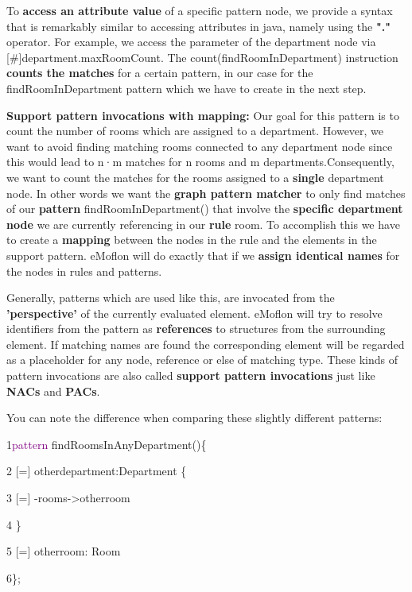 To \textbf{access an attribute value} of a specific pattern node, we provide a syntax that is remarkably similar to accessing attributes in java, namely using the \textbf{"."} operator.\newline
For example, we access the parameter of the department node via \textsf{[\#]department.maxRoomCount}. The \textsf{ count(findRoomInDepartment)} instruction \textbf{counts the matches} for a certain pattern, in our case for the \textsf{findRoomInDepartment} pattern which we have to create in the next step.\newline

\textbf{Support pattern invocations with mapping:}\newline
Our goal for this pattern is to count the number of rooms which are assigned to a department. However, we want to avoid finding matching rooms connected to any department node since this would lead to \textsf{n·m} matches for \textsf{n} rooms and \textsf{m} departments.\newline Consequently, we want to count the matches for the rooms assigned to a \textbf{single} department node. In other words we want the \textbf{graph pattern matcher} to only find matches of our \textbf{pattern} \textsf{findRoomInDepartment()} that involve the \textbf{specific department node} we are currently referencing in our \textbf{rule} \textsf{room}. To accomplish this we have to create a \textbf{mapping} between the nodes in the rule and the elements in the support pattern. eMoflon will do exactly that if we \textbf{assign identical names} for the nodes in rules and patterns.\newline

Generally, patterns which are used like this, are invocated from the \textbf{'perspective'} of the currently evaluated element. eMoflon will try to resolve identifiers from the pattern as \textbf{references} to structures from the surrounding element. If matching names are found the corresponding element will be regarded as a placeholder for any node, reference or else of matching type. These kinds of pattern invocations are also called \textbf{support pattern invocations} just like \textbf{NACs} and \textbf{PACs}.\newline

You can note the difference when comparing these slightly different patterns:\newline

{

1\hspace{1cm}\textcolor{Purple}{pattern} findRoomsInAnyDepartment()\{  

2\hspace{1.5cm} [=] otherdepartment:Department \{  

3\hspace{2cm} [=] -rooms->otherroom 

4\hspace{1.5cm} \} 

5\hspace{1.5cm} [=] otherroom: Room 

6\hspace{1cm}\};\newline 

}

